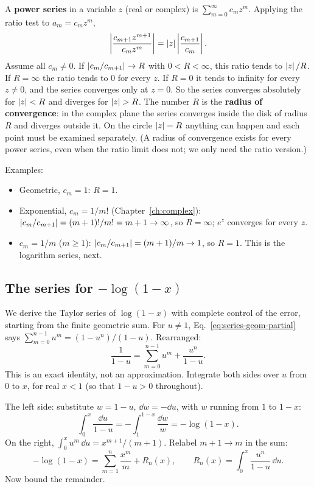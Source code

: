 A \textbf{power series} in a variable $z$ (real or complex) is $\sum_{m=0}^\infty c_mz^m$. Applying the ratio test to $a_m=c_mz^m$,
\[
\left|\frac{c_{m+1}z^{m+1}}{c_mz^m}\right|=\left\lvert z\right\rvert\left|\frac{c_{m+1}}{c_m}\right|.
\]
Assume all $c_m\ne0$. If $\left\lvert c_m/c_{m+1}\right\rvert\to R$ with $0<R<\infty$, this ratio tends to $\left\lvert z\right\rvert/R$. If $R=\infty$ the ratio tends to $0$ for every $z$. If $R=0$ it tends to infinity for every $z\ne0$, and the series converges only at $z=0$. So the series converges absolutely for $\left\lvert z\right\rvert<R$ and diverges for $\left\lvert z\right\rvert>R$. The number $R$ is the \textbf{radius of convergence}: in the complex plane the series converges inside the disk of radius $R$ and diverges outside it. On the circle $\left\lvert z\right\rvert=R$ anything can happen and each point must be examined separately. (A radius of convergence exists for every power series, even when the ratio limit does not; we only need the ratio version.)

Examples:
\begin{itemize}
\item Geometric, $c_m=1$: $R=1$.
\item Exponential, $c_m=1/m!$ (Chapter~\ref{ch:complex}): $\left\lvert c_m/c_{m+1}\right\rvert=(m+1)!/m!=m+1\to\infty$, so $R=\infty$; $e^z$ converges for every $z$.
\item $c_m=1/m$ ($m\ge1$): $\left\lvert c_m/c_{m+1}\right\rvert=(m+1)/m\to1$, so $R=1$. This is the logarithm series, next.
\end{itemize}

\subsection{The series for $-\log(1-x)$}

We derive the Taylor series of $\log(1-x)$ with complete control of the error, starting from the finite geometric sum. For $u\ne1$, Eq.~\eqref{eq:series-geom-partial} says $\sum_{m=0}^{n-1}u^m=(1-u^n)/(1-u)$. Rearranged:
\[
\frac1{1-u}=\sum_{m=0}^{n-1}u^m+\frac{u^n}{1-u}.
\]
This is an exact identity, not an approximation. Integrate both sides over $u$ from $0$ to $x$, for real $x<1$ (so that $1-u>0$ throughout).

The left side: substitute $w=1-u$, $\dd w=-\dd u$, with $w$ running from $1$ to $1-x$:
\[
\int_0^x\frac{\dd u}{1-u}=-\int_1^{1-x}\frac{\dd w}{w}=-\log(1-x).
\]
On the right, $\int_0^xu^m\,\dd u=x^{m+1}/(m+1)$. Relabel $m+1\to m$ in the sum:
\begin{equation}
-\log(1-x)=\sum_{m=1}^{n}\frac{x^m}{m}+R_n(x),\qquad R_n(x)=\int_0^x\frac{u^n}{1-u}\,\dd u .
\label{eq:series-log-remainder}
\end{equation}
Now bound the remainder.


